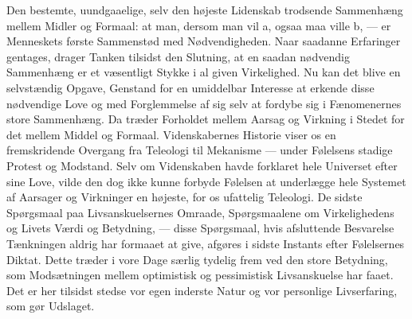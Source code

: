 \documentclass[12pt,a4paper,openany]{book}
\newcommand{\opage}[1]{\marginnote{\footnotesize\textit{[#1]}}}
\begin{document}
Den bestemte, uundgaaelige, selv den højeste Lidenskab trodsende
Sammenhæng mellem Midler og Formaal: at man, dersom man vil a, ogsaa maa
ville b, --- er Menneskets første Sammenstød med Nødvendigheden. Naar
saadanne Erfaringer gentages, drager Tanken tilsidst den Slutning, at en
saadan nødvendig Sammenhæng er et væsentligt Stykke i al given
Virkelighed. Nu kan det blive en selvstændig Opgave, Genstand for en
umiddelbar Interesse at erkende disse nødvendige Love og med
Forglemmelse af sig selv at fordybe sig i Fænomenernes store Sammenhæng.
Da træder Forholdet mellem
\opage{357}Aarsag og Virkning i Stedet for det mellem Middel og Formaal.
Videnskabernes Historie viser os en fremskridende Overgang fra Teleologi
til Mekanisme --- under Følelsens stadige Protest og Modstand. Selv om
Videnskaben havde forklaret hele Universet efter sine Love, vilde den
dog ikke kunne forbyde Følelsen at underlægge hele Systemet af Aarsager
og Virkninger en højeste, for os ufattelig Teleologi. De sidste
Spørgsmaal paa Livsanskuelsernes Omraade, Spørgsmaalene om
Virkelighedens og Livets Værdi og Betydning, --- disse Spørgsmaal, hvis
afsluttende Besvarelse Tænkningen aldrig har formaaet at give, afgøres i
sidste Instants efter Følelsernes Diktat. Dette træder i vore Dage
særlig tydelig frem ved den store Betydning, som Modsætningen mellem
optimistisk og pessimistisk Livsanskuelse har faaet. Det er her tilsidst
stedse vor egen inderste Natur og vor personlige Livserfaring, som gør
Udslaget.
\end{document}
